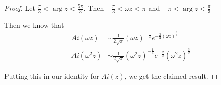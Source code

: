 \documentclass[a4paper]{article}
\begin{document}
\begin{eg}
\begin{proof}
	Let $\frac{\pi}{3} < \arg z < \frac{5\pi}{3}$. Then $-\frac{\pi}{3 } < \omega z < \pi$ and $-\pi < \arg z < \frac{\pi}{3}$ 

	Then we know that 
	\begin{align*}
		Ai(\omega z) &\sim \frac{1}{2\sqrt{\pi} } (\omega z)^{-\frac{1}{4}} e^{-\frac{2}{3} (\omega z)^{\frac{3}{2}}} \\
		Ai(\omega^2 z) &\sim \frac{1}{2\sqrt{\pi} } (\omega ^2 z)^{-\frac{1}{4}} e^{-\frac{2}{3}} (\omega^2 z)^{\frac{3}{2}}
	\end{align*}

	Putting this in our identity for $Ai(z)$, we get the claimed result.
\end{proof}
\end{eg}
\end{document}
